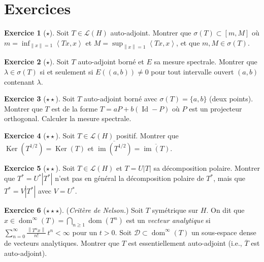 \documentclass[a4paper,12pt]{book}
\DeclareMathOperator{\im}{im}
\DeclareMathOperator{\Id}{Id}
\DeclareMathOperator{\Ker}{Ker}
\DeclareMathOperator{\dom}{dom}
\newcommand{\norm}[1]{\left\| #1 \right\|}
\newcommand{\abs}[1]{\left| #1 \right|}
\newcommand{\inner}[2]{\left\langle #1, #2 \right\rangle}
\theoremstyle{definition}
\newtheorem{exercice}{Exercice}[chapter]
\theoremstyle{plain}
\theoremstyle{remark}
\begin{document}
\section{Exercices}

\begin{exercice}[$\star$]
Soit $T \in \mathcal{L}(H)$ auto-adjoint. Montrer que $\sigma(T) \subset [m, M]$ où
$m = \inf_{\norm{x}=1} \inner{Tx}{x}$ et $M = \sup_{\norm{x}=1} \inner{Tx}{x}$, et
que $m, M \in \sigma(T)$.
\end{exercice}

\begin{exercice}[$\star$]
Soit $T$ auto-adjoint borné et $E$ sa mesure spectrale. Montrer que
$\lambda \in \sigma(T)$ si et seulement si $E((a,b)) \neq 0$ pour tout intervalle ouvert
$(a,b)$ contenant $\lambda$.
\end{exercice}

\begin{exercice}[$\star\star$]
Soit $T$ auto-adjoint borné avec $\sigma(T) = \{a, b\}$ (deux points). Montrer que $T$
est de la forme $T = aP + b(\Id - P)$ où $P$ est un projecteur orthogonal. Calculer la
mesure spectrale.
\end{exercice}

\begin{exercice}[$\star\star$]
Soit $T \in \mathcal{L}(H)$ positif. Montrer que $\Ker(T^{1/2}) = \Ker(T)$ et
$\overline{\im(T^{1/2})} = \overline{\im(T)}$.
\end{exercice}

\begin{exercice}[$\star\star$]
Soit $T \in \mathcal{L}(H)$ et $T = U\abs{T}$ sa décomposition polaire. Montrer que
$T^* = U^*\abs{T^*}$ n'est pas en général la décomposition polaire de $T^*$, mais que
$T^* = V\abs{T^*}$ avec $V = U^*$.
\end{exercice}

\begin{exercice}[$\star\star\star$]
(\emph{Critère de Nelson.}) Soit $T$ symétrique sur $H$. On dit que $x \in \dom^\infty(T) = \bigcap_{n \ge 1} \dom(T^n)$ est un \emph{vecteur analytique} si
$\sum_{n=0}^\infty \frac{\norm{T^n x}}{n!}\,t^n < \infty$ pour un $t > 0$. Soit
$\mathcal{D} \subset \dom^\infty(T)$ un sous-espace dense de vecteurs analytiques.
Montrer que $T$ est essentiellement auto-adjoint (i.e., $\overline{T}$ est auto-adjoint).
\end{exercice}
\end{document}
